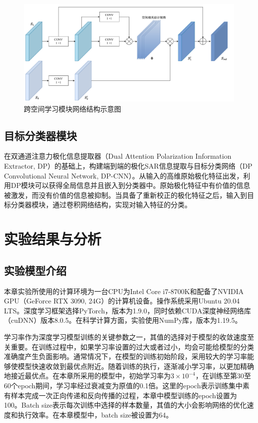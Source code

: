 \begin{figure}[ht!]
    \centering
    \includegraphics[width=14cm]{pic/chapter3/跨空间学习.pdf}
    \caption{跨空间学习模块网络结构示意图}
    \label{DPEN_CSL}
\end{figure}

\subsection{目标分类器模块}
在双通道注意力极化信息提取器（Dual Attention Polarization Information Extractor, DP）的基础上，构建端到端的极化SAR信息提取与目标分类网络（DP Convolutional Neural Network, DP-CNN）。从输入的高维原始极化特征出发，利用DP模块可以获得全局信息并且嵌入到分类器中。原始极化特征中有价值的信息被激发，而没有价值的信息被抑制。当具备了重新校正的极化特征之后，输入到目标分类器模块，通过卷积网络结构，实现对输入特征的分类。




\section{实验结果与分析}
\subsection{实验模型介绍}
\label{sec:实验模型介绍}
本章实验所使用的计算环境为一台CPU为Intel Core i7-8700K和配备了NVIDIA GPU（GeForce RTX 3090, 24G）的计算机设备。操作系统采用Ubuntu 20.04 LTS。深度学习框架选择PyTorch，版本为1.9.0，同时依赖CUDA深度神经网络库（cuDNN）版本8.0.5。在科学计算方面，实验使用NumPy库，版本为1.19.5。

学习率作为深度学习模型训练的关键参数之一，其值的选择对于模型的收敛速度至关重要。在训练过程中，如果学习率设置的过大或者过小，均会可能给模型的分类准确度产生负面影响。通常情况下，在模型的训练初始阶段，采用较大的学习率能够使模型快速收敛到最优点附近。随着训练的执行，逐渐减小学习率，以更加精确地接近最优点。在本章所采用的模型中，初始学习率为$3\times 10^{-4}$，在训练至第30至60个epoch期间，学习率经过衰减变为原值的0.1倍。这里的epoch表示训练集中素有样本完成一次正向传递和反向传播的过程，本章中模型训练的epoch设置为100。Batch size表示每次训练中选择的样本数量，其值的大小会影响网络的优化速度和执行效率。在本章模型中，batch size被设置为64。

